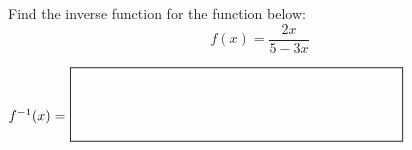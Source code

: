 \documentclass[addpoints,12pt]{exam}
\newcommand*{\Scale}[2][4]{\scalebox{#1}{\ensuremath{#2}}}%
\begin{document}
\begin{questions}
\question[8] Find the inverse function for the function below:
\[
f(x)=\dfrac{2x}{5-3x}
\]
\vfill
\begin{center}
            $
                \mbox{$f^{-1}(x)=$ } \Scale[1.5]{\boxed{ \phantom{\dfrac{\dfrac{a}{b}}{b}} \hspace{5cm} }}
            $
            \end{center}
\newpage





\end{questions}
\end{document}
